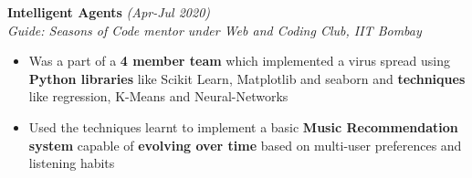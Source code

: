 \documentclass[a4paper,11pt]{article}
\begin{document}
\textbf{Intelligent Agents} \hfill \emph{(Apr-Jul 2020)}\\
\emph{Guide: Seasons of Code mentor under Web and Coding Club, IIT Bombay}
\vspace{-7pt}
\begin{itemize}[noitemsep]
    \item Was a part of a \textbf{4 member team} which implemented a virus spread using \textbf{Python libraries} like Scikit Learn, Matplotlib and seaborn and \textbf{techniques} like regression, K-Means and Neural-Networks
    \item Used the techniques learnt to implement a basic \textbf{Music Recommendation system} capable of \textbf{evolving over time} based on multi-user preferences and listening habits 
\end{itemize}
\vspace{-3pt}


\end{document}
